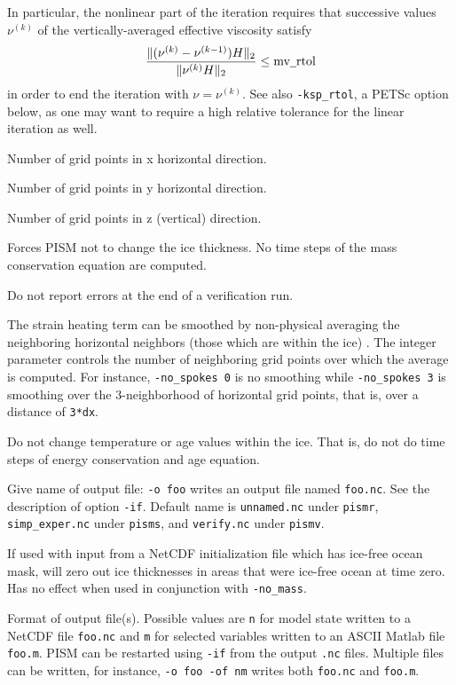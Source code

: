 \documentclass[11pt,final]{amsart}
\begin{document}
In particular, the nonlinear part of the iteration requires that successive values $\nu^{(k)}$ of the vertically-averaged effective viscosity satisfy
	$$\frac{\|(\nu^{(k)} - \nu^{(k-1)}) H\|_2}{\|\nu^{(k)} H\|_2} \le \text{mv$\underline{\,\,\,}$rtol}$$
in order to end the iteration with $\nu = \nu^{(k)}$.  See also \verb|-ksp_rtol|, a PETSc option below, as one may want to require a high relative tolerance for the linear iteration as well.

  Number of grid points in x horizontal direction.

  Number of grid points in y horizontal direction.

  Number of grid points in z (vertical) direction.

  Forces PISM not to change the ice thickness.  No time steps of the mass conservation equation are computed.

  Do not report errors at the end of a verification run.

  The strain heating term can be smoothed by non-physical averaging the neighboring horizontal neighbors (those which are within the ice) \cite{BBL}.  The integer parameter controls the number of neighboring grid points over which the average is computed.  For instance, \verb|-no_spokes 0| is no smoothing while \verb|-no_spokes 3| is smoothing over the 3-neighborhood of horizontal grid points, that is, over a distance of \verb|3*dx|.

  Do not change temperature or age values within the ice.  That is, do not do time steps of energy conservation and age equation.

 Give name of output file: \verb|-o foo| writes an output file named \verb|foo.nc|.  See the description of option \verb|-if|.  Default name is \verb|unnamed.nc| under \verb|pismr|, \verb|simp_exper.nc| under \verb|pisms|, and \verb|verify.nc| under \verb|pismv|.

  If used with input from a NetCDF initialization file which has ice-free ocean mask, will zero out ice thicknesses in areas that were ice-free ocean at time zero.  Has no effect when used in conjunction with \verb|-no_mass|.

  Format of output file(s).  Possible values are \verb|n| for model state written to a NetCDF file \verb|foo.nc| and \verb|m| for selected variables written to an ASCII Matlab file \verb|foo.m|.  PISM can be restarted using \verb|-if| from the output \verb|.nc| files.  Multiple files can be written, for instance, \verb|-o foo -of nm| writes both \verb|foo.nc| and \verb|foo.m|.
\end{document}
